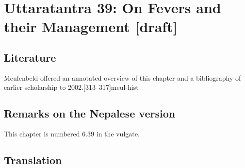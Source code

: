 
\chapter{Uttaratantra 39:  On Fevers and their Management [draft]}

\section{Literature} 

Meulenbeld offered an annotated overview of this chapter and a bibliography
of earlier scholarship to 2002.[313--317]{meul-hist} 

\section{Remarks on the Nepalese version}

This chapter is numbered 6.39 in the vulgate.


\newpage

\section{Translation}

